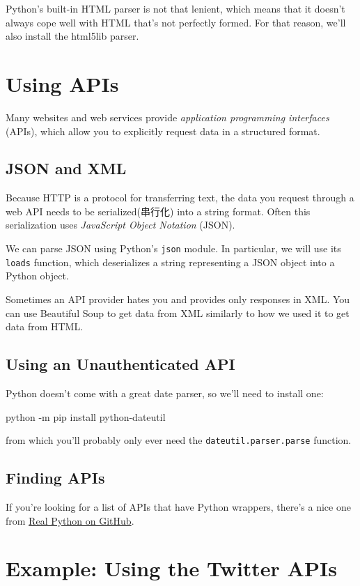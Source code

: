 Python's built-in HTML parser is not that lenient, which means that it doesn't always
cope well with HTML that's not perfectly formed. For that reason, we'll also install the
html5lib parser.

\section{Using APIs}
Many websites and web services provide \emph{application programming interfaces} (APIs),
which allow you to explicitly request data in a structured format.
\subsection{JSON and XML}
Because HTTP is a protocol for transferring text, the data you request through a web
API needs to be serialized(串行化) into a string format. Often this serialization uses \emph{JavaScript Object Notation} (JSON).

We can parse JSON using Python's \verb|json| module. In particular, we will use its \verb|loads| function, which deserializes a string representing a JSON object into a Python object.

Sometimes an API provider hates you and provides only responses in XML. You can use Beautiful Soup to get data from XML similarly to how we used it to get
data from HTML.

\subsection{Using an Unauthenticated API}
Python doesn't come with a great date parser, so we'll need to install one:
\begin{pyc}
    python -m pip install python-dateutil
\end{pyc}

from which you'll probably only ever need the \verb|dateutil.parser.parse| function.
\subsection{Finding APIs}
If you’re looking for a list of APIs that have Python wrappers, there’s a nice one from
\href{https://github.com/realpython/list-of-python-api-wrappers}{Real Python on GitHub}.

\section{Example: Using the Twitter APIs}

